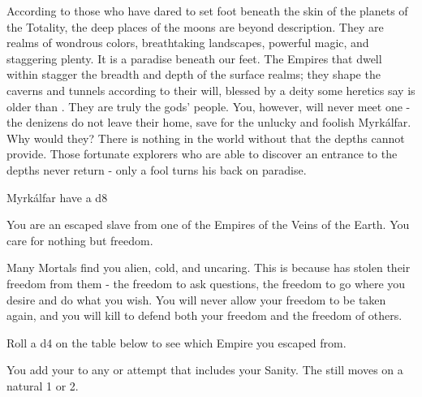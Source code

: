   According to those who have dared to set foot beneath the skin of the planets of the Totality, the deep places of the moons are beyond description.  They are realms of wondrous colors, breathtaking landscapes, powerful magic, and staggering plenty.  It is a paradise beneath our feet.  The Empires that dwell within stagger the breadth and depth of the surface realms; they shape the caverns and tunnels according to their will, blessed by a deity some heretics say is older than \TheAuthority.  They are truly the gods' people.  You, however, will never meet one - the denizens do not leave their home, save for the unlucky and foolish Myrkálfar.  Why would they?  There is nothing in the world without that the depths cannot provide. Those fortunate explorers who are able to discover an entrance to the depths never return - only a fool turns his back on paradise.\footnotemark[\value{footnote}]



  \setcounter{footnote}{0}  



  Myrkálfar have a d8 \FLESH


  You are an escaped slave from one of the Empires of the Veins of the Earth.  You care for nothing but freedom.  

  Many Mortals find you alien, cold, and uncaring.  This is because \TheAuthority has stolen their freedom from them - the freedom to ask questions, the freedom to go where you desire and do what you wish.  You will never allow your freedom to be taken again, and you will kill to defend both your freedom and the freedom of others.

  Roll a d4 on the  table below to see which Empire you escaped from.


  You add your \LVL to any \RO or \RB attempt that includes your Sanity.  The \UD still moves \DCDOWN on a natural 1 or 2.


